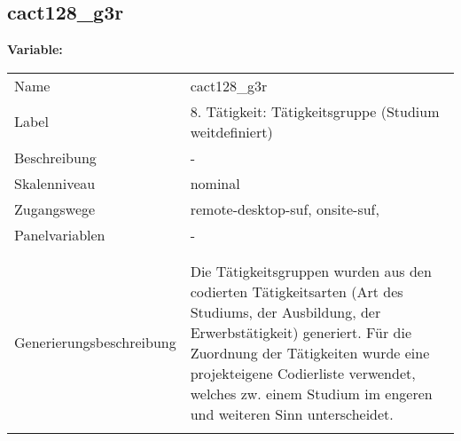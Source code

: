 	
	
	\subsection{cact128\_g3r}
	\label{subSection:cact128_g3r}

	\noindent\textbf{Variable:}\\
		\begin{tabular}{lL{11.3cm}}
			\label{tableVariable:cact128_g3r}
			Name & cact128\_g3r \\
			Label & 8. Tätigkeit: Tätigkeitsgruppe (Studium weitdefiniert) \\
			Beschreibung & - \\
			Skalenniveau & nominal \\
			Zugangswege &
				remote-desktop-suf,
				onsite-suf,
 \\
			Panelvariablen & -
			 \\
			 \\
 \\
					Generierungsbeschreibung & Die Tätigkeitsgruppen wurden aus den codierten Tätigkeitsarten (Art des Studiums, der Ausbildung, der Erwerbstätigkeit) generiert. Für die Zuordnung der Tätigkeiten wurde eine projekteigene Codierliste verwendet, welches zw. einem Studium im engeren und weiteren Sinn unterscheidet.
				 \\	
			 \\
		\end{tabular}






